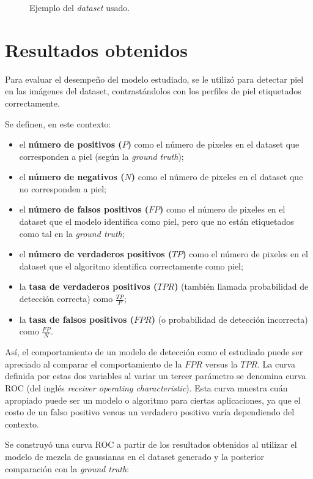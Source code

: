 \documentclass[12pt]{article}
\begin{document}
\begin{figure}[H]
    \caption{Ejemplo del \emph{dataset} usado.}
\end{figure}

\section{Resultados obtenidos}

Para evaluar el desempeño del modelo estudiado, se le utilizó para detectar piel
en las imágenes del dataset, contrastándolos con los perfiles de piel
etiquetados correctamente. 

Se definen, en este contexto: 

\begin{itemize}
    \item el \textbf{número de positivos ($P$)} como el número de pixeles en el dataset
        que corresponden a piel (según la \emph{ground truth});
    \item el \textbf{número de negativos ($N$)} como el número de pixeles en el dataset
        que no corresponden a piel;
    \item el \textbf{número de falsos positivos ($FP$)} como el número de
        pixeles en el dataset que el modelo identifica como piel, pero que no
        están etiquetados como tal en la \emph{ground truth};
    \item el \textbf{número de verdaderos positivos ($TP$)} como el número de
        pixeles en el dataset que el algoritmo identifica correctamente como
        piel;
    \item la \textbf{tasa de verdaderos positivos ($TPR$)} (también llamada
        probabilidad de detección correcta) como $\frac{TP}{P}$;
    \item la \textbf{tasa de falsos positivos ($FPR$)} (o probabilidad de
        detección incorrecta) como $\frac{FP}{N}$.
\end{itemize}

Así, el comportamiento de un modelo de detección como el estudiado puede ser
apreciado al comparar el comportamiento de la $FPR$ versus la $TPR$. La curva
definida por estas dos variables al variar un tercer parámetro se denomina curva
ROC (del inglés \emph{receiver operating characteristic}). Esta curva muestra
cuán apropiado puede ser un modelo o algoritmo para ciertas aplicaciones, ya que
el costo de un falso positivo versus un verdadero positivo varía dependiendo del
contexto.

Se construyó una curva ROC a partir de los resultados obtenidos al utilizar el modelo de mezcla
de gaussianas en el dataset generado y la posterior comparación con la
\emph{ground truth}:
\end{document}
